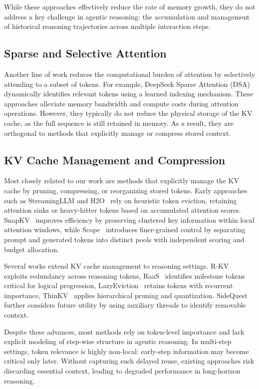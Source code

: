\documentclass[11pt]{article}
\begin{document}
While these approaches effectively reduce the rate of memory growth, they do not address a key challenge in agentic reasoning: the accumulation and management of historical reasoning trajectories across multiple interaction steps.

\subsection{Sparse and Selective Attention}

Another line of work reduces the computational burden of attention by selectively attending to a subset of tokens. For example, DeepSeek Sparse Attention (DSA)~\cite{liu2025dsa} dynamically identifies relevant tokens using a learned indexing mechanism. These approaches alleviate memory bandwidth and compute costs during attention operations. However, they typically do not reduce the physical storage of the KV cache, as the full sequence is still retained in memory. As a result, they are orthogonal to methods that explicitly manage or compress stored context.

\subsection{KV Cache Management and Compression}

Most closely related to our work are methods that explicitly manage the KV cache by pruning, compressing, or reorganizing stored tokens. Early approaches such as StreamingLLM and H2O~\cite{zhang2023h2o} rely on heuristic token eviction, retaining attention sinks or heavy-hitter tokens based on accumulated attention scores. SnapKV~\cite{li2024snapkv} improves efficiency by preserving clustered key information within local attention windows, while Scope~\cite{scope} introduces finer-grained control by separating prompt and generated tokens into distinct pools with independent scoring and budget allocation.

Several works extend KV cache management to reasoning settings. R-KV~\cite{cai2025rkv} exploits redundancy across reasoning tokens, RaaS~\cite{hu2025raas} identifies milestone tokens critical for logical progression, LazyEviction~\cite{zhang2025lazyeviction} retains tokens with recurrent importance, ThinKV~\cite{ramachandran2025thinkv} applies hierarchical pruning and quantization. SideQuest~\cite{sidequest} further considers future utility by using auxiliary threads to identify removable context.

Despite these advances, most methods rely on token-level importance and lack explicit modeling of step-wise structure in agentic reasoning. In multi-step settings, token relevance is highly non-local: early-step information may become critical only later. Without capturing such delayed reuse, existing approaches risk discarding essential context, leading to degraded performance in long-horizon reasoning.
\end{document}
